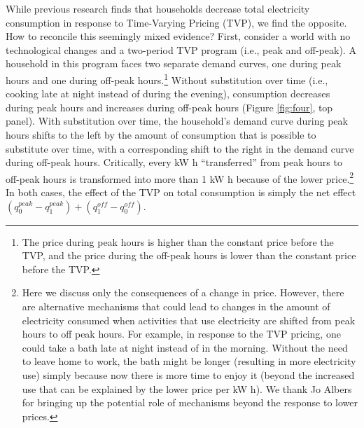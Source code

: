 \documentclass[12pt]{article}
\begin{document}
While previous research finds that households decrease total electricity consumption in response to Time-Varying Pricing (TVP), we find the opposite. How to reconcile this seemingly mixed evidence? First, consider a world with no technological changes and a two-period TVP program (i.e., peak and off-peak). A household in this program faces two separate demand curves, one during peak hours and one during off-peak hours.\footnote{The price during peak hours is higher than the constant price before the TVP, and the price during the off-peak hours is lower than the constant price before the TVP.} Without substitution over time (i.e., cooking late at night instead of during the evening), consumption decreases during peak hours and increases during off-peak hours (Figure \ref{fig:four}, top panel). With substitution over time, the household’s demand curve during peak hours shifts to the left by the amount of consumption that is possible to substitute over time, with a corresponding shift to the right in the demand curve during off-peak hours. Critically, every kW h \enquote{transferred} from peak hours to off-peak hours is transformed into more than 1 kW h because of the lower price.\footnote{Here we discuss only the consequences of a change in price. However, there are alternative mechanisms that could lead to changes in the amount of electricity consumed when activities that use electricity are shifted from peak hours to off peak hours. For example, in response to the TVP pricing, one could take a bath late at night instead of in the morning. Without the need to leave home to work, the bath might be longer (resulting in more electricity use) simply because now there is more time to enjoy it (beyond the increased use that can be explained by the lower price per kW h). We thank Jo Albers for bringing up the potential role of mechanisms beyond the response to lower prices.} In both cases, the effect of the TVP on total consumption is simply the net effect $ \left( q_{0}^{peak}-q_{1}^{peak} \right) + \left( q_{1}^{off}-q_{0}^{off} \right) $.
\end{document}
